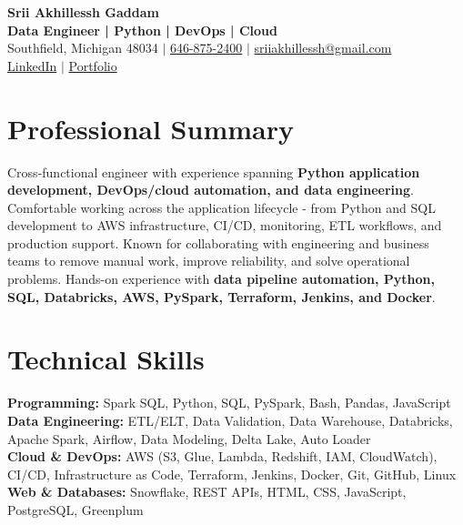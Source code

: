 \documentclass[letterpaper,10pt]{article}
\begin{document}
\fontsize{9.35pt}{10.45pt}\selectfont

\begin{center}
    {\LARGE \textbf{Srii Akhillessh Gaddam}} \\[-1pt]
    \textbf{Data Engineer | Python | DevOps | Cloud} \\[2pt]
    Southfield, Michigan 48034 $|$
    \href{tel:6468752400}{646-875-2400} $|$
    \href{mailto:sriiakhillessh@gmail.com}{sriiakhillessh@gmail.com} \\[1pt]
    \href{https://www.linkedin.com/in/srii-akhiilessh-gaddam-b48668191/}{LinkedIn} $|$
    \href{https://sriiakhillesshg.github.io/portfolio/}{Portfolio}
\end{center}
\vspace{-8pt}

\section{Professional Summary}
\small{Cross-functional engineer with experience spanning \textbf{Python application development, DevOps/cloud automation, and data engineering}. Comfortable working across the application lifecycle - from Python and SQL development to AWS infrastructure, CI/CD, monitoring, ETL workflows, and production support. Known for collaborating with engineering and business teams to remove manual work, improve reliability, and solve operational problems. Hands-on experience with \textbf{data pipeline automation, Python, SQL, Databricks, AWS, PySpark, Terraform, Jenkins, and Docker}.}

\section{Technical Skills}
\small{
\textbf{Programming:} Spark SQL, Python, SQL, PySpark, Bash, Pandas, JavaScript \\
\textbf{Data Engineering:} ETL/ELT, Data Validation, Data Warehouse, Databricks, Apache Spark, Airflow, Data Modeling, Delta Lake, Auto Loader \\
\textbf{Cloud \& DevOps:} AWS (S3, Glue, Lambda, Redshift, IAM, CloudWatch), CI/CD, Infrastructure as Code, Terraform, Jenkins, Docker, Git, GitHub, Linux \\
\textbf{Web \& Databases:} Snowflake, REST APIs, HTML, CSS, JavaScript, PostgreSQL, Greenplum
}
\end{document}
